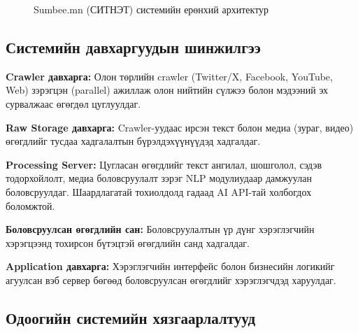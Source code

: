 \begin{figure}[h!]
{%
}
\caption{Sumbee.mn (СИТНЭТ) системийн ерөнхий архитектур}
\label{fig:sumbee_arch}
\end{figure}

\subsection{Системийн давхаргуудын шинжилгээ}

\textbf{Crawler давхарга:} Олон төрлийн crawler (Twitter/X, Facebook, YouTube, Web) зэрэгцэн (parallel) ажиллаж олон нийтийн сүлжээ болон мэдээний эх сурвалжаас өгөгдөл цуглуулдаг.

\textbf{Raw Storage давхарга:} Crawler-уудаас ирсэн текст болон медиа (зураг, видео) өгөгдлийг тусдаа хадгалалтын бүрэлдэхүүнүүдэд хадгалдаг.

\textbf{Processing Server:} Цугласан өгөгдлийг текст ангилал, шошголол, сэдэв тодорхойлолт, медиа боловсруулалт зэрэг NLP модулиудаар дамжуулан боловсруулдаг. Шаардлагатай тохиолдолд гадаад AI API-тай холбогдох боломжтой.

\textbf{Боловсруулсан өгөгдлийн сан:} Боловсруулалтын үр дүнг хэрэглэгчийн хэрэгцээнд тохирсон бүтэцтэй өгөгдлийн санд хадгалдаг.

\textbf{Application давхарга:} Хэрэглэгчийн интерфейс болон бизнесийн логикийг агуулсан вэб сервер бөгөөд боловсруулсан өгөгдлийг хэрэглэгчдэд харуулдаг.

\subsection{Одоогийн системийн хязгаарлалтууд}

